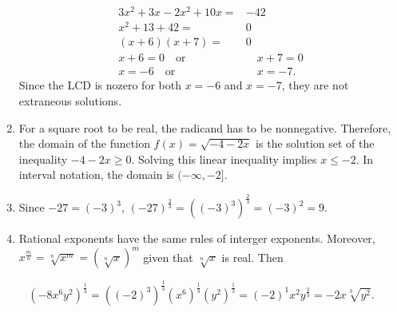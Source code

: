 \documentclass[
  12pt]{article}
\begin{document}
\begin{enumerate}
\[\begin{aligned}
   3x^2+3x-2x^2+10x=&-42\\
   x^2+13+42=&0\\
   (x+6)(x+7)=&0\\
   x+6=0\quad\text{or}&\quad x+7=0\\
   x=-6\quad\text{or}&\quad x=-7.
   \end{aligned}
   \] Since the LCD is nozero for both \(x=-6\) and \(x=-7\), they are
  not extraneous solutions.
\item
  For a square root to be real, the radicand has to be nonnegative.
  Therefore, the domain of the function \(f(x)=\sqrt{-4-2x}\) is the
  solution set of the inequality \(-4-2x\ge 0\). Solving this linear
  inequality implies \(x\le -2\). In interval notation, the domain is
  \((-\infty, -2]\).
\item
  Since \(-27=(-3)^3\), \((-27)^{\frac23}=((-3)^3)^{\frac23}=(-3)^2=9\).
\item
  Rational exponents have the same rules of interger exponents.
  Moreover, \(x^{\frac mn}=\sqrt[n]{x^m}=(\sqrt[n]{x})^m\) given that
  \(\sqrt[n]x\) is real. Then
\end{enumerate}

\[
(-8x^6y^2)^{\frac13}=((-2)^3)^{\frac13}(x^6)^{\frac13}(y^2)^{\frac13}=(-2)^1x^2y^{\frac23}=-2x\sqrt[3]{y^2}.
\]
\end{document}
